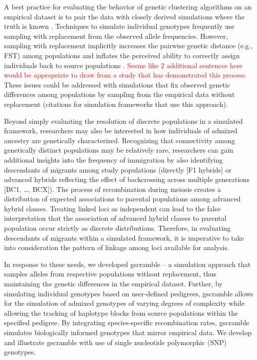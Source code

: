 	A best practice for evaluating the behavior of genetic clustering algorithms on an empirical dataset is to pair the data with closely derived simulations where the truth is known \citep{vaha2006efficiency,anderson2008improved,latch2011fine}. 
	Techniques to simulate individual genotypes frequently use sampling with replacement from the observed allele frequencies.
	However, sampling with replacement implicitly increases the pairwise genetic distance (e.g., FST) among populations and inflates the perceived ability to correctly assign individuals back to source populations \cite{almudevar2000exact,anderson2008improved}.  
	\textcolor{red}{Seems like 2 additional sentences here would be appropriate to draw from a study that has demonstrated this process.}  
	These issues could be addressed with simulations that fix observed genetic differences among populations by sampling from the empirical data without replacement (citations for simulation frameworks that use this approach).
	
	Beyond simply evaluating the resolution of discrete populations in a simulated framework, researchers may also be interested in how individuals of admixed ancestry are genetically characterized.  
	Recognizing that connectivity among genetically distinct populations may be relatively rare, researchers can gain additional insights into the frequency of immigration by also identifying descendants of migrants among study populations (directly [F1 hybrids] or advanced hybrids reflecting the effect of backcrossing across multiple generations [BC1, \ldots, BCX]).  
	The process of recombination during meiosis creates a distribution of expected associations to parental populations among advanced hybrid classes. 
	Treating linked loci as independent can lead to the false interpretation that the association of advanced hybrid classes to parental population occur strictly as discrete distributions.  
	Therefore, in evaluating descendants of migrants within a simulated framework, it is imperative to take into consideration the pattern of linkage among loci available for analysis.
	
	In response to these needs, we developed gscramble – a simulation approach that samples alleles from respective populations without replacement, thus maintaining the genetic differences in the empirical dataset.  
	Further, by simulating individual genotypes based on user-defined pedigrees, gscramble allows for the simulation of admixed genotypes of varying degrees of complexity while allowing the tracking of haplotype blocks from source populations within the specified pedigree.  
	By integrating species-specific recombination rates, gscramble simulates biologically informed genotypes that mirror empirical data.  
	We develop and illustrate gscramble with use of single nucleotide polymorphic (SNP) genotypes.


